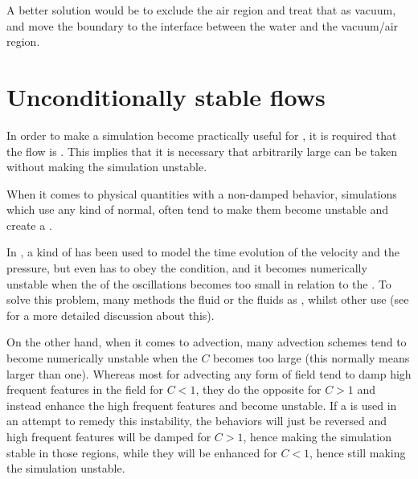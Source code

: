 A better solution would be to exclude the air region and treat that as vacuum, and move the boundary to the interface between the water and the vacuum/air region.

\section{Unconditionally stable flows}

In order to make a \FVM simulation become practically useful for , it is required that the flow is . This implies that it is necessary that arbitrarily large \timesteps can be taken without making the simulation unstable.

When it comes to physical quantities with a non-damped \oscillating behavior, simulations which use any kind of normal,  often tend to make them become unstable and create a .

In \thisprojectwork, a kind of  has been used to model the time evolution of the velocity and the pressure, but even  has to obey the \CFL condition, and it becomes numerically unstable when the \period of the oscillations becomes too small in relation to the \timestep. To solve this problem, many methods \approximate the fluid or the fluids as \incompressible, whilst other use  (see 
 for a more detailed discussion about this).

On the other hand, when it comes to advection, many advection schemes tend to become numerically unstable when the  $C$ becomes too large (this normally means larger than one). Whereas most  for advecting any form of field tend to damp high frequent features in the field for $C < 1$, they do the opposite for $C > 1$ and instead enhance the high frequent features and become unstable. If a  is used in an attempt to remedy this instability, the behaviors will just be reversed and high frequent features will be damped for $C > 1$, hence making the simulation stable in those regions, while they will be enhanced for $C < 1$, hence still making the simulation unstable.


